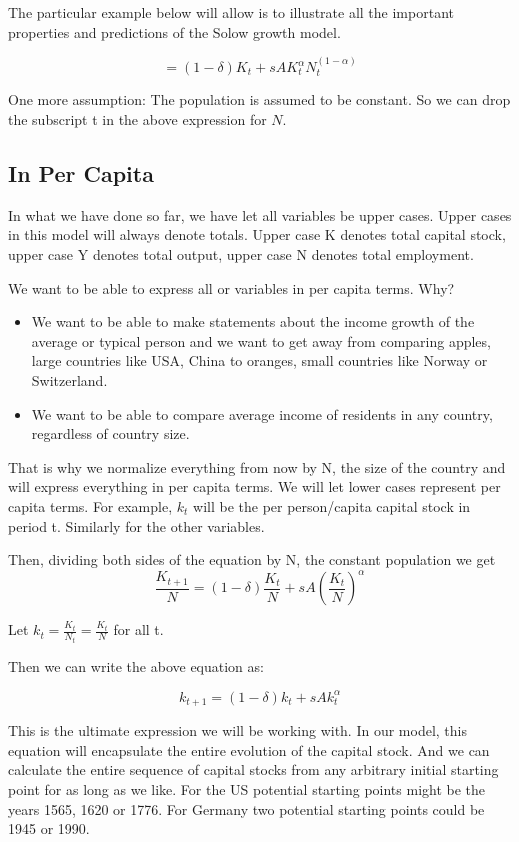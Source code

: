 \documentclass[
]{book}
\providecommand{\tightlist}{%
  \setlength{\itemsep}{0pt}\setlength{\parskip}{0pt}}
\begin{document}
The particular example below will allow is to illustrate all the important properties and predictions of the Solow growth model.

\[=(1-δ) K_t+s A K_t^\alpha N_t^{(1-\alpha)}\]

One more assumption: The population is assumed to be constant. So we can drop the subscript t in the above expression for \(N\).

\hypertarget{in-per-capita}{%
\subsection{In Per Capita}\label{in-per-capita}}

In what we have done so far, we have let all variables be upper cases. Upper cases in this model will always denote totals. Upper case K denotes total capital stock, upper case Y denotes total output, upper case N denotes total employment.

We want to be able to express all or variables in per capita terms. Why?

\begin{itemize}
\tightlist
\item
  We want to be able to make statements about the income growth of the average or typical person and we want to get away from comparing apples, large countries like USA, China to oranges, small countries like Norway or Switzerland.
\item
  We want to be able to compare average income of residents in any country, regardless of country size.
\end{itemize}

That is why we normalize everything from now by N, the size of the country and will express everything in per capita terms. We will let lower cases represent per capita terms. For example, \(k_t\) will be the per person/capita capital stock in period t. Similarly for the other variables.

Then, dividing both sides of the equation by N, the constant population we get
\[\frac{K_{t+1}}{N}=(1-\delta)\frac{K_t}{N}+sA(\frac{K_t}{N})^\alpha\]

Let \(k_t=\frac{K_t}{N_t} = \frac{K_t}{N}\) for all t.

Then we can write the above equation as:

\[k_{t+1}=(1-\delta) k_t+s A k_t^α\]

This is the ultimate expression we will be working with. In our model, this equation will encapsulate the entire evolution of the capital stock. And we can calculate the entire sequence of capital stocks from any arbitrary initial starting point for as long as we like. For the US potential starting points might be the years 1565, 1620 or 1776. For Germany two potential starting points could be 1945 or 1990.
\end{document}
